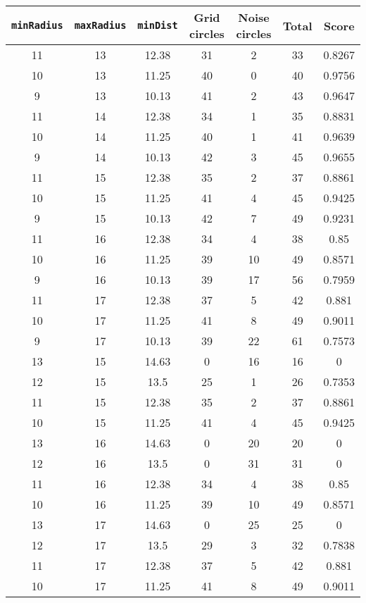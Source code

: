\documentclass[letterpaper, 12pt]{article}
\begin{document}
\begin{longtable}{|c|c|c|c|c|c|c|}
\hline
\textbf{\texttt{minRadius}} & \textbf{\texttt{maxRadius}} & \textbf{\texttt{minDist}} & \textbf{Grid circles} & \textbf{Noise circles} & \textbf{Total} & \textbf{Score} \\
\hline
11 & 13 & 12.38 & 31 & 2 & 33 & 0.8267 \\
\hline
10 & 13 & 11.25 & 40 & 0 & 40 & 0.9756 \\
\hline
9 & 13 & 10.13 & 41 & 2 & 43 & 0.9647 \\
\hline
11 & 14 & 12.38 & 34 & 1 & 35 & 0.8831 \\
\hline
10 & 14 & 11.25 & 40 & 1 & 41 & 0.9639 \\
\hline
9 & 14 & 10.13 & 42 & 3 & 45 & 0.9655 \\
\hline
11 & 15 & 12.38 & 35 & 2 & 37 & 0.8861 \\
\hline
10 & 15 & 11.25 & 41 & 4 & 45 & 0.9425 \\
\hline
9 & 15 & 10.13 & 42 & 7 & 49 & 0.9231 \\
\hline
11 & 16 & 12.38 & 34 & 4 & 38 & 0.85 \\
\hline
10 & 16 & 11.25 & 39 & 10 & 49 & 0.8571 \\
\hline
9 & 16 & 10.13 & 39 & 17 & 56 & 0.7959 \\
\hline
11 & 17 & 12.38 & 37 & 5 & 42 & 0.881 \\
\hline
10 & 17 & 11.25 & 41 & 8 & 49 & 0.9011 \\
\hline
9 & 17 & 10.13 & 39 & 22 & 61 & 0.7573 \\
\hline
13 & 15 & 14.63 & 0 & 16 & 16 & 0 \\
\hline
12 & 15 & 13.5 & 25 & 1 & 26 & 0.7353 \\
\hline
11 & 15 & 12.38 & 35 & 2 & 37 & 0.8861 \\
\hline
10 & 15 & 11.25 & 41 & 4 & 45 & 0.9425 \\
\hline
13 & 16 & 14.63 & 0 & 20 & 20 & 0 \\
\hline
12 & 16 & 13.5 & 0 & 31 & 31 & 0 \\
\hline
11 & 16 & 12.38 & 34 & 4 & 38 & 0.85 \\
\hline
10 & 16 & 11.25 & 39 & 10 & 49 & 0.8571 \\
\hline
13 & 17 & 14.63 & 0 & 25 & 25 & 0 \\
\hline
12 & 17 & 13.5 & 29 & 3 & 32 & 0.7838 \\
\hline
11 & 17 & 12.38 & 37 & 5 & 42 & 0.881 \\
\hline
10 & 17 & 11.25 & 41 & 8 & 49 & 0.9011 \\

\end{longtable}
\end{document}
